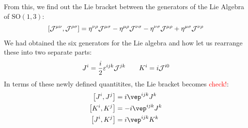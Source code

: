 From this, we find out the Lie bracket between the generators of the Lie Algebra of $\mathrm{SO}(1,3)$:
$$\left[ \mathcal J^{\mu\nu}, \mathcal J^{\rho\sigma} \right] = \eta^{\nu\rho}\mathcal J^{\mu\sigma}-\eta^{\mu\rho}\mathcal J^{\nu\sigma}-\eta^{\nu\sigma}\mathcal J^{\mu\rho}+\eta^{\mu\sigma}\mathcal J^{\nu\rho}$$
We had obtained the six generators for the Lie algebra and how let us rearrange these into two separate parts:
$$J^i = \frac{i}{2}\varepsilon^{ijk}\mathcal J^{jk}\qquad K^i = i\mathcal J^{i0}$$
In terms of these newly defined quantitites, the Lie bracket becomes \textcolor{red}{check!}:
\begin{align*}
    \comtr{J^i}{J^j}&=i \vep^{ijk}J^k\\
    \comtr{K^i}{K^j}&=-i \vep^{ijk}J^k\\
    \comtr{J^i}{K^j}&=i \vep^{ijk}K^k
\end{align*}